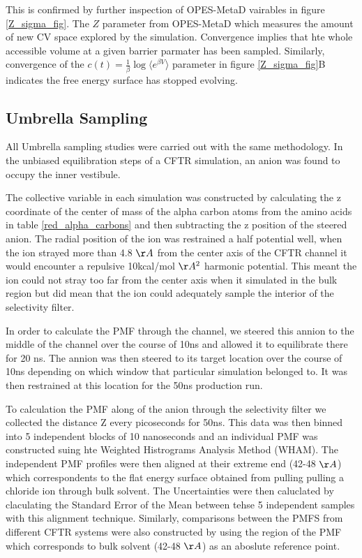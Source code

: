 This is confirmed by further inspection of OPES-MetaD vairables in figure \ref{Z_sigma_fig}. The $Z$ parameter from OPES-MetaD which measures the amount of new CV space explored by the simulation. Convergence implies that hte whole accessible volume at a given barrier parmater has been sampled. Similarly, convergence of the $c(t) = \frac{1}{\beta} \log \langle e^{\beta V} \rangle$ parameter in figure \ref{Z_sigma_fig}B indicates the free energy surface has stopped evolving. 

\subsection{Umbrella Sampling}
All Umbrella sampling studies were carried out with the same methodology. In the unbiased equilibration steps of a CFTR simulation, an anion was found to occupy the inner vestibule. 

The collective variable in each simulation was constructed by calculating the z coordinate of the center of mass of the alpha carbon atoms from the amino acids in table \ref{red_alpha_carbons} and then subtracting the z position of the steered anion. The radial position of the ion was restrained a half potential well, when the ion strayed more than 4.8 $\AA$ from the center axis of the CFTR channel it would encounter a repulsive 10kcal/mol $\AA^2$ harmonic potential. This meant the ion could not stray too far from the center axis when it simulated in the bulk region but did mean that the ion could adequately sample the interior of the selectivity filter.

In order to calculate the PMF through the channel, we steered this annion to the middle of the channel over the course of 10ns and allowed it to equilibrate there for 20 ns. The annion was then steered to its target location over the course of 10ns depending on which window that particular simulation belonged to. It was then restrained at this location for the 50ns production run.

To calculation the PMF along of the anion through the selectivity filter we collected the distance Z every picoseconds for 50ns. This data was then binned into 5 independent blocks of 10 nanoseconds and an individual PMF was constructed suing hte Weighted Histrograms Analysis Method (WHAM). The independent PMF profiles were then aligned at their extreme end (42-48 $\AA$) which correspondents to the flat energy surface  obtained from pulling pulling a chloride ion through bulk solvent. The Uncertainties were then caluclated by claculating the Standard Error of the Mean between tehse 5 independent samples with this alignment technique. Similarly, comparisons between the PMFS from different CFTR systems were also constructed by using the region of the PMF which corresponds to  bulk solvent (42-48 $\AA$) as an aboslute reference point.
